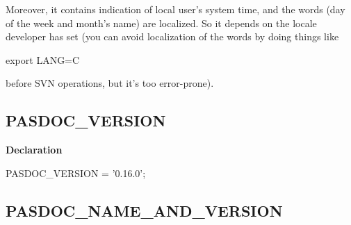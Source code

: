\documentclass{report}
\newif\ifpdf
\begin{document}
\begin{list}{}
\begin{itemize}
Moreover, it contains indication of local user's system time, and the words (day of the week and month's name) are localized. So it depends on the locale developer has set (you can avoid localization of the words by doing things like \begin{ttfamily}export LANG=C\end{ttfamily} before SVN operations, but it's too error{-}prone). 
\end{itemize}

\end{list}
\ifpdf
\subsection*{\large{\textbf{PASDOC{\_}VERSION}}\normalsize\hspace{1ex}\hrulefill}
\else
\subsection*{PASDOC{\_}VERSION}
\fi
\label{PasDoc_Versions-PASDOC_VERSION}
\begin{list}{}{
\setlength{\itemindent}{0cm}
\setlength{\listparindent}{0cm}
\setlength{\leftmargin}{\evensidemargin}
\addtolength{\leftmargin}{\tmplength}
\settowidth{\labelsep}{X}
\addtolength{\leftmargin}{\labelsep}
\setlength{\labelwidth}{\tmplength}
}
\item[\textbf{Declaration}\hfill]
\ifpdf
\begin{flushleft}
\fi
\begin{ttfamily}
PASDOC{\_}VERSION = '0.16.0';\end{ttfamily}

\ifpdf
\end{flushleft}
\fi

\end{list}
\ifpdf
\subsection*{\large{\textbf{PASDOC{\_}NAME{\_}AND{\_}VERSION}}\normalsize\hspace{1ex}\hrulefill}
\else
\end{document}
